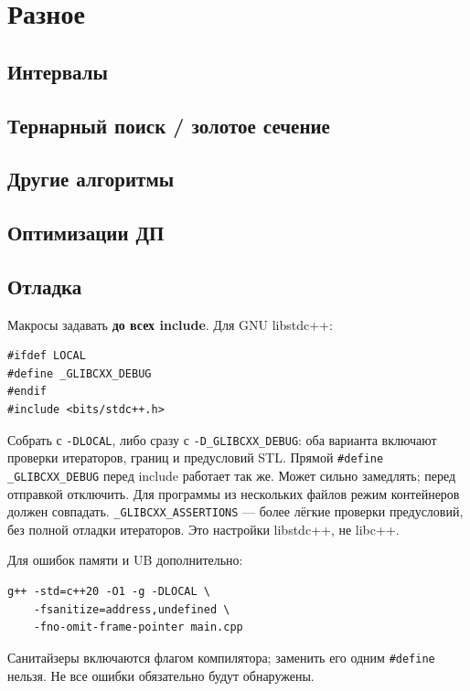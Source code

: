 \chapter{Разное}

\section{Интервалы}

\section{Тернарный поиск / золотое сечение}

\section{Другие алгоритмы}

\section{Оптимизации ДП}

\section{Отладка}
Макросы задавать \textbf{до всех include}. Для GNU libstdc++:
\begin{lstlisting}
#ifdef LOCAL
#define _GLIBCXX_DEBUG
#endif
#include <bits/stdc++.h>
\end{lstlisting}
Собрать с \texttt{-DLOCAL}, либо сразу с \texttt{-D\_GLIBCXX\_DEBUG}:
оба варианта включают проверки итераторов, границ и предусловий STL.
Прямой \texttt{\#define \_GLIBCXX\_DEBUG} перед include работает так же.
Может сильно замедлять; перед отправкой отключить. Для программы из
нескольких файлов режим контейнеров должен совпадать.
\texttt{\_GLIBCXX\_ASSERTIONS} — более лёгкие проверки предусловий,
без полной отладки итераторов. Это настройки libstdc++, не libc++.

Для ошибок памяти и UB дополнительно:
\begin{lstlisting}
g++ -std=c++20 -O1 -g -DLOCAL \
    -fsanitize=address,undefined \
    -fno-omit-frame-pointer main.cpp
\end{lstlisting}
Санитайзеры включаются флагом компилятора; заменить его одним
\texttt{\#define} нельзя. Не все ошибки обязательно будут обнаружены.


